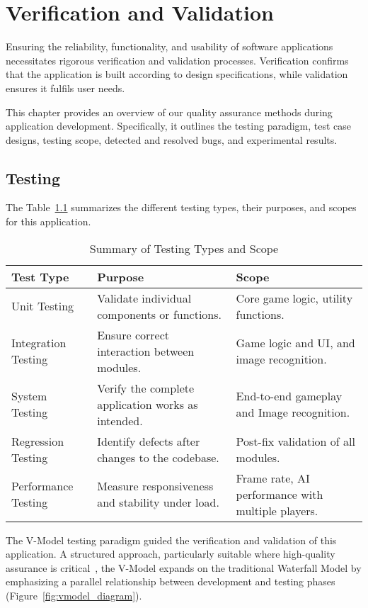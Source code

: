 \chapter{Verification and Validation}
\label{chap:verification-and-validation}

Ensuring the reliability, functionality, and usability of software applications necessitates rigorous verification and validation processes. Verification confirms that the application is built according to design specifications, while validation ensures it fulfils user needs.

This chapter provides an overview of our quality assurance methods during application development. Specifically, it outlines the testing paradigm, test case designs, testing scope, detected and resolved bugs, and experimental results.

\section{Testing}
The Table~\ref{tab:testing_summary} summarizes the different testing types, their purposes, and scopes for this application.

\begin{table}[ht!]
    \centering
    \caption{Summary of Testing Types and Scope}
    \label{tab:testing_summary}
    \begin{tabular}{|p{4cm}|p{4cm}|p{4cm}|}
    \hline
    \textbf{Test Type} & \textbf{Purpose} & \textbf{Scope} \\ \hline
    Unit Testing       & Validate individual components or functions. & Core game logic, utility functions. \\ \hline
    Integration Testing & Ensure correct interaction between modules. & Game logic and UI, and image recognition. \\ 
    \hline
    System Testing     & Verify the complete application works as intended. & End-to-end gameplay and Image recognition. \\ \hline
    Regression Testing & Identify defects after changes to the codebase. & Post-fix validation of all modules. \\ \hline
    Performance Testing & Measure responsiveness and stability under load. & Frame rate, AI performance with multiple players. \\ \hline
    \end{tabular}
\end{table}

The V-Model testing paradigm guided the verification and validation of this application. A structured approach, particularly suitable where high-quality assurance is critical~\cite{bib:vmodel}, the V-Model expands on the traditional Waterfall Model by emphasizing a parallel relationship between development and testing phases (Figure~\ref{fig:vmodel_diagram}). 

